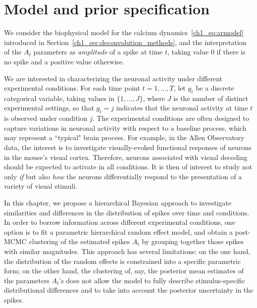 \section{Model and prior specification}
\label{s:model}

We consider the biophysical model for the calcium dynamics~\eqref{ch1_eq:armodel} introduced in Section~\ref{ch1_sec:deconvolution_methods}, and the interpretation of the $A_t$ parameters as \textit{amplitude} of a spike at time $t$, taking value $0$ if there is no spike and a positive value otherwise.

We are interested in characterizing the neuronal activity under different experimental conditions. For each time point $t=1,\dots,T$, let $g_t$ be a discrete categorical variable, taking values in $\{1,\dots, J\}$, where $J$ is the number of distinct experimental settings, so that $g_t=j$ indicates that the neuronal activity at time $t$ is observed under condition $j$. The experimental conditions are often designed to capture variations in neuronal activity with respect to a baseline process, which may represent a ``typical" brain process. For example, in the Allen Observatory data, the interest is to investigate visually-evoked functional responses of neurons in the mouse's visual cortex. Therefore, neurons associated with visual decoding should be expected to activate in all conditions. It is then of interest to study not only \textit{if} but also \textit{how} the neurons differentially respond to the presentation of a variety of visual stimuli. 

In this chapter, we propose a hierarchical Bayesian approach to investigate similarities and differences in the distribution of spikes over time and conditions. In order to borrow information across different experimental conditions, one option is to fit a parametric hierarchical random effect model, and obtain a post-MCMC clustering of the estimated spikes $A_t$ by grouping together those spikes with similar magnitudes. This approach has several limitations: on the one hand, the distribution of the random effects is constrained into a specific parametric form; on the other hand, the clustering of, say, the posterior mean estimates of the parameters $A_t$'s does not allow the model to fully describe stimulus-specific distributional differences and to take into account the posterior uncertainty in the spikes.

